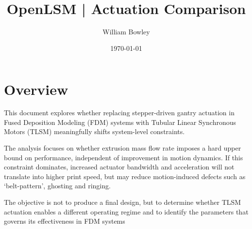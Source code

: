 \documentclass{article}
\title{OpenLSM | Actuation Comparison}
\author{William Bowley}
\date{\today}
\begin{document}
\maketitle

\section{Overview} 
This document explores whether replacing stepper-driven gantry actuation in Fused Deposition Modeling (FDM) systems with
Tubular Linear Synchronous Motors (TLSM) meaningfully shifts system-level constraints.

\vspace{0.5cm}
The analysis focuses on whether extrusion mass flow rate imposes a hard upper bound on performance, independent of 
improvement in motion dynamics. If this constraint dominates, increased actuator bandwidth and acceleration will not translate into
higher print speed, but may reduce motion-induced defects such as `belt-pattern', ghosting and ringing.

\vspace{0.5cm}
The objective is not to produce a final design, but to determine whether TLSM actuation enables a different operating regime and
to identify the parameters that governs its effectiveness in FDM systems
\end{document}
